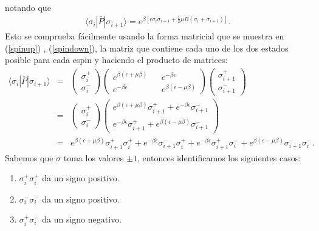 \documentclass[letterpaper,12pt,oneside]{book}
\begin{document}
%
notando que 
%
\begin{eqnarray}
\langle \sigma_{i}|\bar P |\sigma_{i+1}\rangle = e^{\beta\left[\epsilon \sigma_{i}\sigma_{i+1} +\frac{1}{2}\mu B(\sigma_{i} +\sigma_{i+1}) \right]}.
\end{eqnarray}
%
Esto se comprueba f\'acilmente usando la forma matricial que se muestra en (\ref{spinup}) , (\ref{spindown}), la matriz que contiene cada uno de los dos estados posible para cada espin y haciendo el producto de matrices:
%
\begin{eqnarray}
\langle \sigma_{i}|\bar P |\sigma_{i+1}\rangle &=& \begin{pmatrix}
\sigma_{i}^{+}\\\sigma_{i}^{-}
\end{pmatrix}
\begin{pmatrix}
e^{\beta(\epsilon + \mu \beta )} && e^{-\beta \epsilon} \\
e^{-\beta \epsilon} && e^{\beta(\epsilon - \mu \beta )}
\end{pmatrix}
\begin{pmatrix}
\sigma_{i+1}^{+}\\\sigma_{i+1}^{-}
\end{pmatrix} \nonumber \\
&=& \begin{pmatrix}
\sigma_{i}^{+}\\\sigma_{i}^{-}
\end{pmatrix} 
\begin{pmatrix}
e^{\beta(\epsilon + \mu \beta )}\sigma_{i+1}^{+} + e^{-\beta \epsilon} \sigma_{i+1}^{-}\\
e^{-\beta \epsilon}\sigma_{i+1}^{+} +e^{\beta(\epsilon - \mu \beta )}\sigma_{i+1}^{-}
\end{pmatrix} \nonumber\\
&=& e^{\beta(\epsilon + \mu \beta )}\sigma_{i+1}^{+}\sigma_{i}^{+} + e^{-\beta \epsilon} \sigma_{i+1}^{-}\sigma_{i}^{+} + e^{-\beta \epsilon}\sigma_{i+1}^{+}\sigma_{i}^{-} +e^{\beta(\epsilon - \mu \beta )}\sigma_{i+1}^{-}\sigma_{i}^{-}\nonumber.
\end{eqnarray}
%
Sabemos que $\sigma$ toma los valores $\pm 1$, entonces identificamos los siguientes casos:
%
\begin{enumerate}
\item $\sigma_{i}^{+}\sigma_{i}^{+}$ da un signo positivo.
\item $\sigma_{i}^{-}\sigma_{i}^{-}$ da un signo positivo.
\item $\sigma_{i}^{+}\sigma_{i}^{-}$ da un signo negativo.
\end{enumerate}
\end{document}
